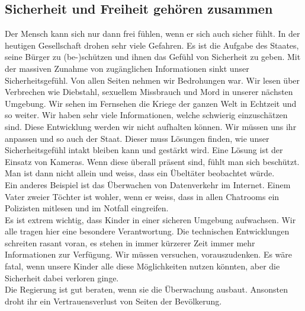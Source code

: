 \subsection{Sicherheit und Freiheit gehören zusammen}
Der Mensch kann sich nur dann frei fühlen, wenn er sich auch sicher 
fühlt. In der heutigen Gesellschaft drohen sehr viele Gefahren. 
Es ist die Aufgabe des Staates, seine Bürger zu (be-)schützen und ihnen 
das Gefühl von Sicherheit zu geben. Mit der massiven Zunahme von 
zugänglichen Informationen sinkt unser Sicherheitsgefühl. Von allen 
Seiten nehmen wir Bedrohungen war. Wir lesen über Verbrechen wie 
Diebstahl, sexuellem Missbrauch und Mord in unserer nächsten 
Umgebung. Wir sehen im Fernsehen die Kriege der ganzen Welt in Echtzeit 
und so weiter. Wir haben sehr viele Informationen, welche schwierig 
einzuschätzen sind. Diese Entwicklung werden wir nicht aufhalten 
können. Wir müssen uns ihr anpassen und so auch der Staat. Dieser muss 
Lösungen finden, wie unser Sicherheitsgefühl intakt bleiben kann und 
gestärkt wird. Eine Lösung ist der Einsatz von 
Kameras. Wenn diese überall präsent sind, fühlt man sich beschützt. Man 
ist dann nicht allein und weiss, dass ein Übeltäter beobachtet würde.\\
Ein anderes Beispiel ist das Überwachen von Datenverkehr im Internet. 
Einem Vater zweier Töchter ist wohler, wenn er weiss, dass in 
allen Chatrooms ein Polizisten mitlesen und im Notfall 
eingreifen.\\
Es ist extrem wichtig, dass Kinder in einer sicheren Umgebung 
aufwachsen. Wir alle tragen hier eine besondere Verantwortung. Die 
technischen Entwicklungen schreiten rasant voran, es stehen in immer 
kürzerer Zeit immer mehr Informationen zur Verfügung. Wir müssen 
versuchen, vorauszudenken. Es wäre fatal, wenn unsere Kinder alle diese 
Möglichkeiten nutzen könnten, aber die Sicherheit dabei verloren ginge.\\
Die Regierung ist gut beraten, wenn sie die Überwachung 
ausbaut. Ansonsten droht ihr ein Vertrauensverlust von Seiten der 
Bevölkerung.

